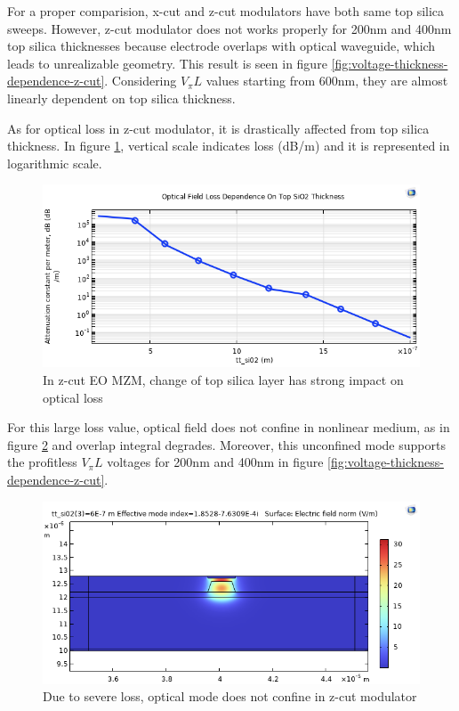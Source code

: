     \newpage

    For a proper comparision, x-cut and z-cut modulators have both same top silica sweeps. However, z-cut modulator does not works properly for 200nm and 400nm top silica thicknesses because electrode overlaps with optical waveguide, which leads to unrealizable geometry. This result is seen in figure \ref{fig:voltage-thickness-dependence-z-cut}. Considering $V_\pi L$ values starting from 600nm, they are almost linearly dependent on top silica thickness.

    As for optical loss in z-cut modulator, it is drastically affected from top silica thickness. In figure \ref{fig:z-cut-tt_sio2-loss}, vertical scale indicates loss (dB/m) and it is represented in logarithmic scale. 

    \begin{figure}[h]
        \centering
        \includegraphics[width=0.75\linewidth]{z-cut loss analysis.png}
        \caption{In z-cut EO MZM, change of top silica layer has strong impact on optical loss}
        \label{fig:z-cut-tt_sio2-loss}
    \end{figure}
    
    For this large loss value, optical field does not confine in nonlinear medium, as in figure \ref{fig:enter-label} and overlap integral degrades. Moreover, this unconfined mode supports the profitless $V_\pi L$ voltages for 200nm and 400nm in figure \ref{fig:voltage-thickness-dependence-z-cut}. 

    \begin{figure}[h]
        \centering
        \includegraphics[width=0.75\linewidth]{z-cut confinement issue.png}
        \caption{Due to severe loss, optical mode does not confine in z-cut modulator}
        \label{fig:enter-label}
    \end{figure}
